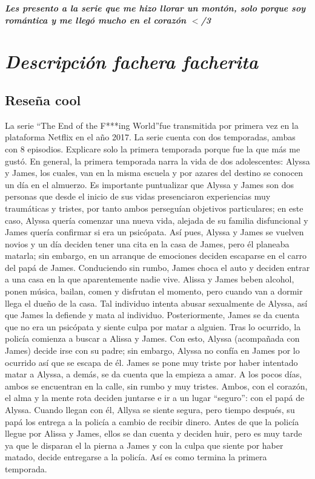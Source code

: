 \documentclass[A5,11pt]{article}
\begin{document}
\begin{center}
    \textbf{\Large{\emph{Les presento a la serie que me hizo llorar un montón, solo porque soy romántica y me llegó mucho en el corazón $<$/3}}}
\end{center}

\section{\emph{Descripción fachera facherita}}
    \subsection{Reseña cool}
        La serie ``The End of the F***ing World''fue transmitida por primera vez en la plataforma Netflix en el año 2017. La serie cuenta con dos temporadas, ambas con 8 episodios. Explicare solo la primera temporada porque fue la que más me gustó. En general, la primera temporada narra la vida de dos adolescentes: Alyssa y James, los cuales, van en la misma escuela y por azares del destino se conocen un día en el almuerzo. Es importante puntualizar que Alyssa y James son dos personas que desde el inicio de sus vidas presenciaron experiencias muy traumáticas y tristes, por tanto ambos perseguían objetivos particulares; en este caso, Alyssa quería comenzar una nueva vida, alejada de su familia disfuncional y James quería confirmar si era un psicópata. Así pues, Alyssa y James se vuelven novios y un día deciden tener una cita en la casa de James, pero él planeaba matarla; sin embargo, en un arranque de emociones deciden escaparse en el carro del papá de James. Conduciendo sin rumbo, James choca el auto y deciden entrar a una casa en la que aparentemente nadie vive. Alissa y James beben alcohol, ponen música, bailan, comen y disfrutan el momento, pero cuando van a dormir llega el dueño de la casa. Tal individuo intenta abusar sexualmente de Alyssa, así que James la defiende y mata al individuo. Posteriormente, James se da cuenta que no era un psicópata y siente culpa por matar a alguien. Tras lo ocurrido, la policía comienza a buscar a Alissa y James. Con esto, Alyssa (acompañada con James) decide irse con su padre; sin embargo, Alyssa no confía en James por lo ocurrido así que se escapa de él. James se pone muy triste por haber intentado matar a Alyssa, a demás, se da cuenta que la empieza a amar. A los pocos días, ambos se encuentran en la calle, sin rumbo y muy tristes. Ambos, con el corazón, el alma y la mente rota deciden juntarse e ir a un lugar ``seguro'': con el papá de Alyssa. Cuando llegan con él, Allysa se siente segura, pero tiempo después, su papá los entrega a la policía a cambio de recibir dinero. Antes de que la policía llegue por Alissa y James, ellos se dan cuenta y deciden huir, pero es muy tarde ya que le disparan el la pierna a James y con la culpa que siente por haber matado, decide entregarse a la policía. Así es como termina la primera temporada.
        
\end{document}
